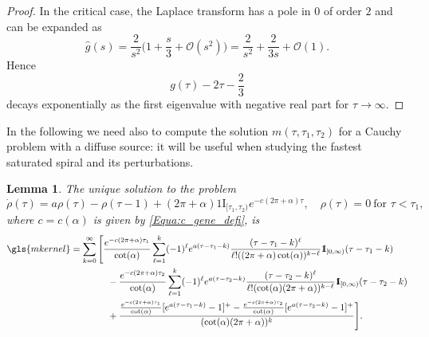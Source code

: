 \documentclass[reqno]{amsart}
\theoremstyle{definition} \newtheorem{definition}{Definition}[section]
\theoremstyle{definition} \newtheorem{remark}[definition]{Remark}
\theoremstyle{plain} \newtheorem{lemma}[definition]{Lemma}
\theoremstyle{plain} \newtheorem{proposition}[definition]{Proposition}
\theoremstyle{plain} \newtheorem{theorem}[definition]{Theorem}
\theoremstyle{plain} \newtheorem{corollary}[definition]{Corollary}
\theoremstyle{definition} \newtheorem{example}[definition]{Example}
\theoremstyle{plain} \newtheorem{claim}[clai]{Claim}
\theoremstyle{definition} \newtheorem{assumption}[definition]{Assumption}
\theoremstyle{definition} \newtheorem{observation}[definition]{Observation}
\newcommand{\ind}{1\!\!\mathrm{I}}
\newcommand{\1}{\mathbbm 1}
\numberwithin{equation}{section} %
\theoremstyle{plain} \newtheorem*{theorem*}{Theorem}
\theoremstyle{plain} \newtheorem{mthm}[maintheorem]{Main Theorem}
\theoremstyle{plain} \newtheorem*{mthm*}{Main Theorem}
\theoremstyle{plain} \newtheorem*{conjecture*}{Conjecture}
\theoremstyle{plain} \newtheorem{conjecture}[definition]{Conjecture}
\theoremstyle{plain} \newtheorem*{problem*}{Problem}
\begin{document}
\begin{proof}
In the critical case, the Laplace transform has a pole in $0$ of order $2$ and can be expanded as
\begin{equation*}
\hat g(s) = \frac{2}{s^2} \bigg( 1 + \frac{s}{3} + \mathcal O(s^2) \bigg) = \frac{2}{s^2} + \frac{2}{3s} + \mathcal O(1).
\end{equation*}
Hence
$$
g(\tau) - 2 \tau - \frac{2}{3}
$$
decays exponentially as the first eigenvalue with negative real part for $\tau \to \infty$.
\end{proof}

In the following we need also to compute the solution $m(\tau,\tau_1,\tau_2)$ for a Cauchy problem with a diffuse source: it will be useful when studying the fastest saturated spiral and its perturbations.

\begin{lemma}
\label{Lem:expli_source_RDE}
The unique solution to the problem
\begin{equation}
\label{Equa:kernel_source}
\dot \rho(\tau) = a \rho(\tau)-\rho(\tau-1) + (2\pi+\alpha) \ind_{[\tau_1,\tau_2)} e^{-c(2\pi+\alpha)\tau}, \quad \rho(\tau) = 0 \ \text{for $\tau < \tau_1$},
\end{equation}
where $c = c(\alpha)$ is given by \eqref{Equa:c_gene_defi}, is 
\begin{align*}
\gls{mkernel} &= \sum_{k=0}^\infty \Bigg[ \frac{e^{-c (2\pi + \alpha) \tau_1}}{\cot(\alpha)} \sum_{\ell = 1}^k (-1)^\ell e^{a (\tau - \tau_1 - k)} \frac{(\tau - \tau_1 - k)^\ell}{\ell! ((2\pi + \alpha) \cot(\alpha))^{k-\ell}} \ind_{[0,\infty)}(\tau - \tau_1 - k) \\
& \qquad \qquad - \frac{e^{-c(2\pi + \alpha) \tau_2}}{\cot(\alpha)} \sum_{\ell = 1}^k (-1)^\ell e^{a (\tau - \tau_2 - k)} \frac{(\tau - \tau_2 - k)^\ell}{\ell! (\cot(\alpha) (2\pi + \alpha))^{k-\ell}} \ind_{[0,\infty)}(\tau - \tau_2 - k) \\
& \qquad \qquad + \frac{\frac{e^{- c (2\pi+\alpha) \tau_1}}{\cot(\alpha)} [ e^{a (\tau - \tau_1 - k)} - 1 ]^+ - \frac{e^{-c(2\pi+\alpha) \tau_2}}{\cot(\alpha)} [ e^{a (\tau - \tau_2 - k)} - 1 ]^+}{(\cot(\alpha) (2\pi + \alpha))^{k}} \Bigg].
\end{align*}
\end{lemma}
\end{document}
